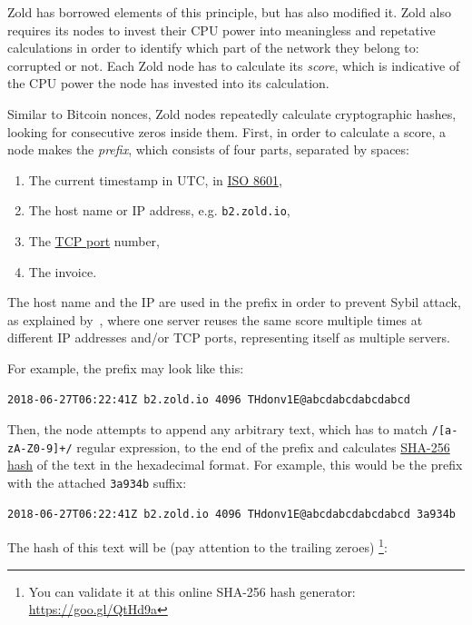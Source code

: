 \documentclass[11pt,oneside]{article}
\newcommand\dd[1]{\colorbox{gray!30}{\texttt{#1}}}
\begin{document}
Zold has borrowed elements of this principle, but has also modified it. Zold also requires
its nodes to invest their CPU power into meaningless and repetative
calculations in order to identify which part of the network they belong to:
corrupted or not. Each Zold node has to calculate its \emph{score},
which is indicative of the CPU power the node has invested into its calculation.

Similar to Bitcoin nonces, Zold nodes repeatedly calculate cryptographic hashes,
looking for consecutive zeros inside them. First, in order to calculate a score,
a node makes the \emph{prefix}, which consists of four parts,
separated by spaces:

\begin{enumerate}
\item The current timestamp in UTC, in \href{https://en.wikipedia.org/wiki/ISO_8601}{ISO 8601},
\item The host name or IP address, e.g. \dd{b2.zold.io},
\item The \href{https://en.wikipedia.org/wiki/Port_(computer_networking)}{TCP port} number,
\item The invoice.
\end{enumerate}

The host name and the IP are used in the prefix in order to prevent Sybil attack,
as explained by~\textcite{douceur2002},
where one server reuses the same score multiple times at different IP addresses
and/or TCP ports, representing itself as multiple servers.

For example, the prefix may look like this:

\begin{verbatim}
2018-06-27T06:22:41Z b2.zold.io 4096 THdonv1E@abcdabcdabcdabcd
\end{verbatim}

Then, the node attempts to append any arbitrary text, which has to match
\dd{/[a-zA-Z0-9]+/} regular expression, to the end of the prefix and calculates
\href{https://en.wikipedia.org/wiki/SHA-2}{SHA-256 hash}
of the text in the hexadecimal format. For example, this would be the prefix
with the attached \dd{3a934b} suffix:

\begin{verbatim}
2018-06-27T06:22:41Z b2.zold.io 4096 THdonv1E@abcdabcdabcdabcd 3a934b
\end{verbatim}

The hash of this text will be (pay attention to the trailing zeroes)%
\footnote{You can validate it at this online SHA-256 hash generator:
\url{https://goo.gl/QtHd9a}}:
\end{document}
